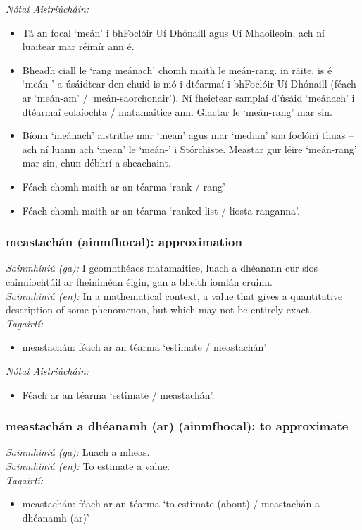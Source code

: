  \noindent \textit{Nótaí Aistriúcháin:}
\begin{itemize}
	\item Tá an focal `meán' i bhFoclóir Uí Dhónaill agus Uí Mhaoileoin, ach ní luaitear mar réimír ann é.
	\item Bheadh ciall le `rang meánach' chomh maith le meán-rang. in ráite, is é `meán-' a úsáidtear den chuid is mó i dtéarmaí i bhFoclóir Uí Dhónaill (féach ar `meán-am' / `meán-saorchonair'). Ní fheictear samplaí d'úsáid `meánach' i dtéarmaí eolaíochta / matamaitice ann. Glactar le `meán-rang' mar sin.
	\item Bíonn `meánach' aistrithe mar `mean' agus mar `median' sna foclóirí thuas -- ach ní luann ach `mean' le `meán-' i Stórchiste. Meastar gur léire `meán-rang' mar sin, chun débhrí a sheachaint.
	\item Féach chomh maith ar an téarma `rank / rang'
	\item Féach chomh maith ar an téarma `ranked list / liosta ranganna'.
\end{itemize}


\subsubsection*{meastachán (ainmfhocal): approximation}
 \noindent \textit{Sainmhíniú (ga):} I gcomhthéacs matamaitice, luach a dhéanann cur síos cainníochtúil ar fheiniméan éigin, gan a bheith iomlán cruinn.
\\
 \noindent \textit{Sainmhíniú (en):} In a mathematical context, a value that gives a quantitative description of some phenomenon, but which may not be entirely exact.
\\
 \noindent \textit{Tagairtí:}
\begin{itemize}
	\item meastachán: féach ar an téarma `estimate / meastachán'
\end{itemize}

 \noindent \textit{Nótaí Aistriúcháin:}
\begin{itemize}
	\item Féach ar an téarma `estimate / meastachán'.
\end{itemize}


\subsubsection*{meastachán a dhéanamh (ar) (ainmfhocal): to approximate}
 \noindent \textit{Sainmhíniú (ga):} Luach a mheas.
\\
 \noindent \textit{Sainmhíniú (en):} To estimate a value.
\\
 \noindent \textit{Tagairtí:}
\begin{itemize}
	\item meastachán: féach ar an téarma `to estimate (about) / meastachán a dhéanamh (ar)'
\end{itemize}

